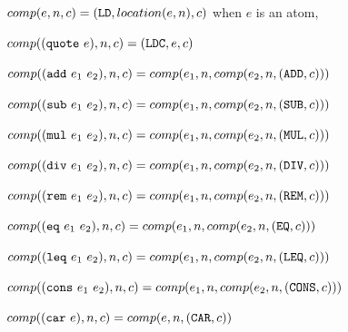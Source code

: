 \bull $\\{comp}(e,n,c)=({\tt LD},\\{location}(e,n),c)$ when $e$ is an atom,

\bull $\\{comp}(({\tt quote}~e),n,c) = ({\tt LDC}, e, c)$

\bull $\\{comp}(({\tt add}~e_{1}~e_{2}),n,c) = \\{comp}(e_{1},n,%
\\{comp}(e_{2},n,({\tt ADD}, c)))$

\bull $\\{comp}(({\tt sub}~e_{1}~e_{2}),n,c) = \\{comp}(e_{1},n,%
\\{comp}(e_{2},n,({\tt SUB}, c)))$

\bull $\\{comp}(({\tt mul}~e_{1}~e_{2}),n,c) = \\{comp}(e_{1},n,%
\\{comp}(e_{2},n,({\tt MUL}, c)))$

\bull $\\{comp}(({\tt div}~e_{1}~e_{2}),n,c) = \\{comp}(e_{1},n,%
\\{comp}(e_{2},n,({\tt DIV}, c)))$

\bull $\\{comp}(({\tt rem}~e_{1}~e_{2}),n,c) = \\{comp}(e_{1},n,%
\\{comp}(e_{2},n,({\tt REM}, c)))$

\bull $\\{comp}(({\tt eq}~e_{1}~e_{2}),n,c) = \\{comp}(e_{1},n,%
\\{comp}(e_{2},n,({\tt EQ}, c)))$

\bull $\\{comp}(({\tt leq}~e_{1}~e_{2}),n,c) = \\{comp}(e_{1},n,%
\\{comp}(e_{2},n,({\tt LEQ}, c)))$

\bull $\\{comp}(({\tt cons}~e_{1}~e_{2}),n,c) = \\{comp}(e_{1},n,%
\\{comp}(e_{2},n,({\tt CONS}, c)))$

\bull $\\{comp}(({\tt car}~e),n,c) = \\{comp}(e,n,({\tt CAR}, c))$

